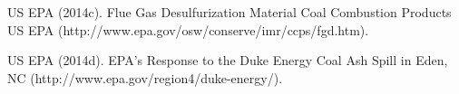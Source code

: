\documentclass[ms]{uncgdissertationexp}
\theoremstyle{plain}
\theoremstyle{definition}
\theoremstyle{remark}
\begin{document}
  \hypertarget{ref-usepaFlueGasDesulfurization2014}{}
  US EPA (2014c). Flue Gas Desulfurization Material \textbar{} Coal
  Combustion Products \textbar{} US EPA
  (http://www.epa.gov/osw/conserve/imr/ccps/fgd.htm).
  
  \hypertarget{ref-usepaEPAResponseDuke2014}{}
  US EPA (2014d). EPA's Response to the Duke Energy Coal Ash Spill in
  Eden, NC (http://www.epa.gov/region4/duke-energy/).





\appendix


\end{document}
